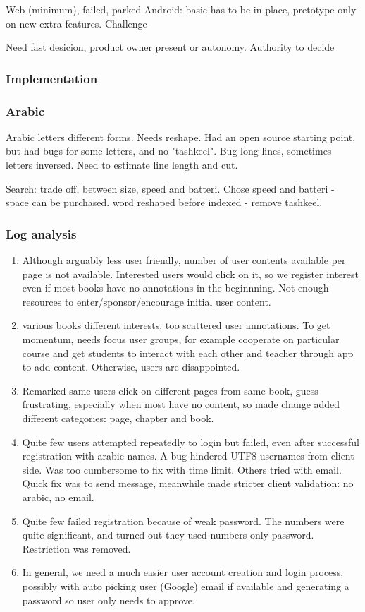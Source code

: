 \documentclass[a4paper,10pt]{article}
\begin{document}
Web (minimum), failed, parked
Android: basic has to be in place, pretotype only on new extra features. Challenge


Need fast desicion, product owner present or autonomy.
Authority to decide

\subsubsection{Implementation}
\subsubsection{Arabic}
Arabic letters different forms. Needs reshape. Had an open source starting point, but had bugs for some letters, and no "tashkeel".
Bug long lines, sometimes letters inversed.
Need to estimate line length and cut.

Search: trade off, between size, speed and batteri. Chose speed and batteri - space can be purchased.
word reshaped before indexed - remove tashkeel.


\subsubsection{Log analysis}

\begin{enumerate}
\item Although arguably less user friendly, number of user contents available per page is not available. Interested users would click on it, so
we register interest even if most books have no annotations in the beginnning. Not enough resources to enter/sponsor/encourage initial user 
content.
\item various books different interests, too scattered user annotations. To get momentum, needs focus user groups, for example cooperate on 
particular course and get students to interact with each other and teacher through app to add content. Otherwise, users are disappointed.
\item Remarked same users click on different pages from same book, guess frustrating, especially when most have no content, 
so made change added different categories: page, chapter and book.
\item Quite few users attempted repeatedly to login but failed, even after successful registration with arabic names. A bug hindered UTF8 
usernames from client side. Was too cumbersome to fix with time limit. Others tried with email. Quick fix was to send message, 
meanwhile made stricter client validation: no arabic, no email.
\item Quite few failed registration because of weak password. The numbers were quite significant, and turned out they used numbers only password.
Restriction was removed.
\item In general, we need a much easier user account creation and login process, possibly with auto picking user (Google) email if available
and generating a password so user only needs to approve.
\end{enumerate}
\end{document}
